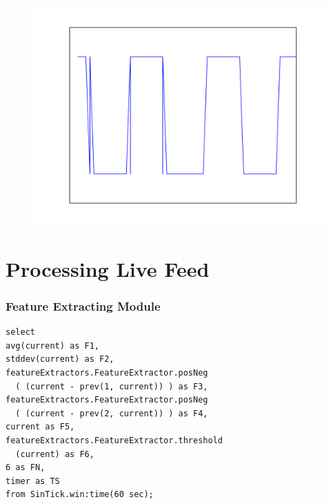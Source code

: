 \documentclass{beamer}
\begin{document}
\begin{frame}[foot]
\begin{figure}
{{      \includegraphics[scale=.28]{./gfx/feature3.png}
      }}
    \end{figure}
  \end{frame}

\section{Processing Live Feed}

  \begin{frame}
    \frametitle{Feature Extracting Module}
    \begin{lstlisting}
select
avg(current) as F1,
stddev(current) as F2,
featureExtractors.FeatureExtractor.posNeg
  ( (current - prev(1, current)) ) as F3,
featureExtractors.FeatureExtractor.posNeg
  ( (current - prev(2, current)) ) as F4,
current as F5,
featureExtractors.FeatureExtractor.threshold
  (current) as F6,
6 as FN,
timer as TS
from SinTick.win:time(60 sec);
    \end{lstlisting}
  \end{frame}
\end{document}
